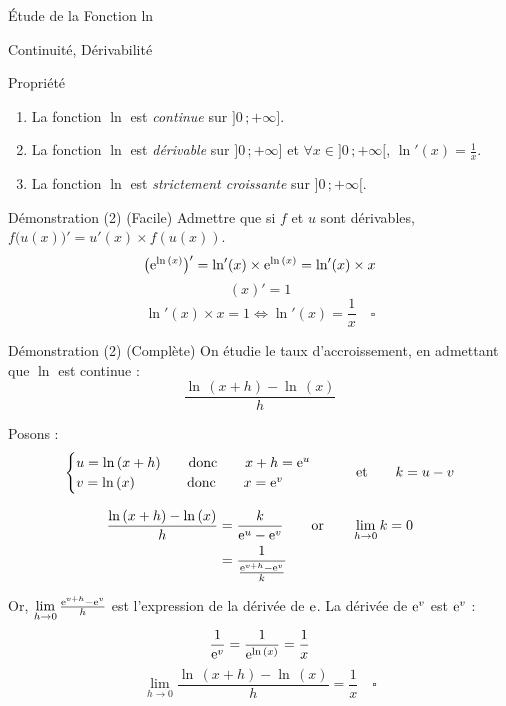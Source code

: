 \documentclass{cours}
\begin{document}
    \begin{Gpartie}{Étude de la Fonction ln}
        \begin{Spartie}{Continuité, Dérivabilité}
            \begin{SSpartie}{Propriété}
                \begin{enumerate}[(1)]
                    \item La fonction $\ln$ est \emph{continue} sur $\big]0\,;+\infty\big]$.
                    \item La fonction $\ln$ est \emph{dérivable} sur $\big]0\,;+\infty\big]$ et $\forall x\in\big]0\,;+\infty\big[$, $\boxed{\ln'(x)=\frac{1}{x}}$.
                    \item La fonction $\ln$ est \emph{strictement croissante} sur $\big]0\,;+\infty\big[$.
                \end{enumerate}
                \begin{SSSpartie}{Démonstration (2) (Facile)}
                    Admettre que si $f$ et $u$ sont dérivables, $f\big(u(x)\big)'=u'(x)\times f(u(x))$.
                    \[\big(\mathrm{e}^{\ln\,(x)}\big)'=\ln'(x)\times \mathrm{e}^{\ln\,(x)}=\ln'(x)\times x\]
                    \[(x)'=1\]
                    \[\ln'(x)\times x=1\iff\ln'(x)=\frac{1}{x}\quad\square\]
                    
                \end{SSSpartie}
                \begin{SSSpartie}{Démonstration (2) (Complète)} 
                    On étudie le taux d'accroissement, en admettant que $\ln$ est continue :
                    \[\frac{\ln\,(x+h)-\ln\,(x)}{h}\]

                    Posons :
                    \[\begin{cases}
                        u=\ln\,(x+h)\qquad\text{donc}\qquad x+h=\mathrm{e}^u \\ v=\ln\,(x)\phantom{+h)}\text{\qquad donc\qquad} x=\mathrm{e}^v
                    \end{cases}\qquad\text{et}\qquad k=u-v\]

                    \[\begin{aligned}[t]
                        \frac{\ln\,(x+h)-\ln\,(x)}{h}&=\frac{k}{\mathrm{e}^u-\mathrm{e}^v}\qquad\text{or}\qquad\lim_{h\to0}k=0 \\
                        &=\frac{1}{\frac{\mathrm{e}^{v+h}-\mathrm{e}^v}{k}}
                    \end{aligned}\]

                    Or, $\lim\limits_{h\to0}\frac{\mathrm{e}^{v+h}-\mathrm{e}^v}{h}$ est l'expression de la dérivée de $\mathrm{e}$. La dérivée de $\mathrm{e}^v$ est $\mathrm{e}^v$ :
                    \[\frac{1}{\mathrm{e}^v}=\frac{1}{\mathrm{e}^{\ln\,(x)}}=\frac{1}{x}\]
                    \[\lim\limits_{h\to 0}\frac{\ln\,(x+h)-\ln\,(x)}{h}=\frac{1}{x}\quad\square\]


\end{SSSpartie}
\end{SSpartie}
\end{Spartie}
\end{Gpartie}
\end{document}
